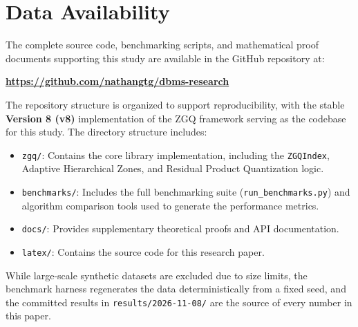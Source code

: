 \documentclass[conference]{IEEEtran}
\begin{document}
\section*{Data Availability}
The complete source code, benchmarking scripts, and mathematical proof documents supporting this study are available in the GitHub repository at:

\noindent\textbf{\url{https://github.com/nathangtg/dbms-research}}

\noindent The repository structure is organized to support reproducibility, with the stable \textbf{Version 8 (v8)} implementation of the ZGQ framework serving as the codebase for this study. The directory structure includes:
\begin{itemize}
    \item \texttt{zgq/}: Contains the core library implementation, including the \texttt{ZGQIndex}, Adaptive Hierarchical Zones, and Residual Product Quantization logic.
    \item \texttt{benchmarks/}: Includes the full benchmarking suite (\texttt{run\_benchmarks.py}) and algorithm comparison tools used to generate the performance metrics.
    \item \texttt{docs/}: Provides supplementary theoretical proofs and API documentation.
    \item \texttt{latex/}: Contains the source code for this research paper.
\end{itemize}
While large-scale synthetic datasets are excluded due to size limits, the benchmark harness regenerates the data deterministically from a fixed seed, and the committed results in \texttt{results/2026-11-08/} are the source of every number in this paper.
\end{document}
